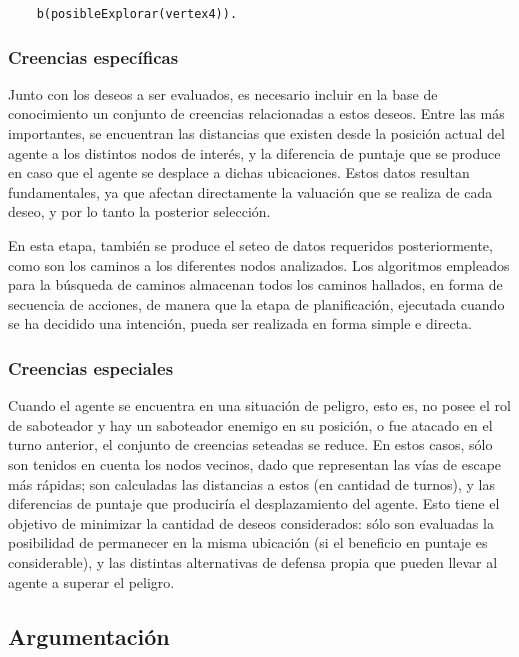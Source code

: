 \documentclass[oneside]{book}
\begin{document}
\begin{verbatim}
    b(posibleExplorar(vertex4)).
\end{verbatim}

\subsubsection{Creencias específicas} %

Junto con los deseos a ser evaluados, es necesario incluir en la base de conocimiento 
un conjunto de creencias relacionadas a estos deseos. Entre las más importantes, se 
encuentran las distancias que existen desde la posición actual del agente a los distintos 
nodos de interés, y la diferencia de puntaje que se produce en caso que el agente se desplace 
a dichas ubicaciones. Estos datos resultan fundamentales, ya que afectan directamente la 
valuación que se realiza de cada deseo, y por lo tanto la posterior selección.

En esta etapa, también se produce el seteo de datos requeridos posteriormente, como son 
los caminos a los diferentes nodos analizados. Los algoritmos empleados para la búsqueda 
de caminos almacenan todos los caminos hallados, en forma de secuencia de acciones, de 
manera que la etapa de planificación, ejecutada cuando se ha decidido una intención, 
pueda ser realizada en forma simple e directa.

\subsubsection{Creencias especiales} %

Cuando el agente se encuentra en una situación de peligro, esto es, no posee el rol de 
saboteador y hay un saboteador enemigo en su posición, o fue atacado en el turno anterior, 
el conjunto de creencias seteadas se reduce. En estos casos, sólo son tenidos en cuenta 
los nodos vecinos, dado que representan las vías de escape más rápidas; son calculadas 
las distancias a estos (en cantidad de turnos), y las diferencias de puntaje que produciría 
el desplazamiento del agente. Esto tiene el objetivo de minimizar la cantidad de deseos 
considerados: sólo son evaluadas la posibilidad de permanecer en la misma ubicación 
(si el beneficio en puntaje es considerable), y las distintas alternativas de defensa 
propia que pueden llevar al agente a superar el peligro.

\subsection{Argumentación}
\end{document}
